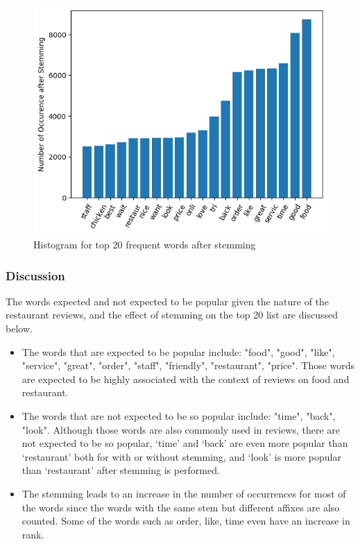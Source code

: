 \documentclass[sigconf]{acmart}
\begin{document}
\begin{figure}[ht]
  \centering
  \includegraphics[width=\linewidth]{frequent_stem.png}
  \caption{Histogram for top 20 frequent words after stemming}
  \label{fig:hist_stem}
\end{figure}

\subsubsection{Discussion} The words expected and not expected to be popular given the nature of the restaurant reviews, and the effect of stemming on the top 20 list are discussed below.

\begin{itemize}
\item The words that are expected to be popular include: "food", "good", "like", "service", "great", "order", "staff", "friendly", "restaurant", "price". Those words are expected to be highly associated with the context of reviews on food and restaurant.
\item The words that are not expected to be so popular include: "time", "back", "look". Although those words are also commonly used in reviews, there are not expected to be so popular, ‘time’ and ‘back’ are even more popular than ‘restaurant’ both for with or without stemming, and ‘look’ is more popular than ‘restaurant’ after stemming is performed.
\item The stemming leads to an increase in the number of occurrences for most of the words since the words with the same stem but different affixes are also counted. Some of the words such as order, like, time even have an increase in rank.
\end{itemize}
\end{document}

